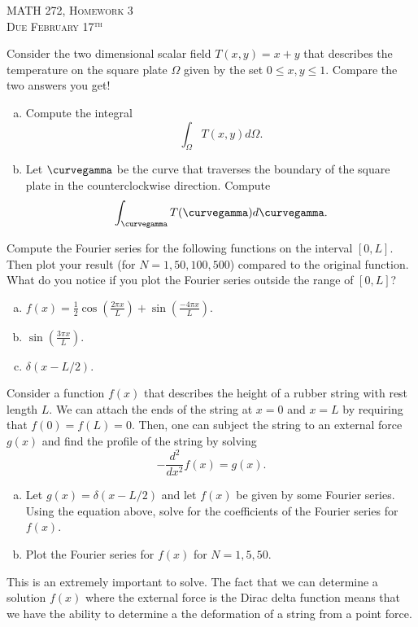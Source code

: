 \documentclass[12pt]{article} %
\begin{document}
\begin{center}
   \textsc{\large MATH 272, Homework 3}\\
   \textsc{Due February 17$^\textrm{th}$}
\end{center}
\vspace{.5cm}

%
%
\begin{problem}
Consider the two dimensional scalar field $T(x,y)=x+y$ that describes the temperature on the square plate $\Omega$ given by the set $0\leq x,y \leq 1$.  Compare the two answers you get!
\begin{enumerate}[(a)]
	\item Compute the integral
	\[
	\int_\Omega T(x,y)d\Omega.
	\]
	\item Let $\curvegamma$ be the curve that traverses the boundary of the square plate in the counterclockwise direction.  Compute
	\[
	\int_{\curvegamma} T(\curvegamma)d\curvegamma. 
	\]
\end{enumerate}
\end{problem}

\begin{problem}
Compute the Fourier series for the following functions on the interval $[0,L]$. Then plot your result (for $N=1,50,100,500$) compared to the original function. What do you notice if you plot the Fourier series outside the range of $[0,L]$?
\begin{enumerate}[(a)]
	\item $f(x)=\frac{1}{2}\cos\left(\frac{2\pi x}{L}\right)+\sin\left(\frac{-4\pi x}{L}\right)$.
	\item $\sin\left(\frac{3\pi x}{L}\right)$.
	\item $\delta(x-L/2)$.
\end{enumerate}
\end{problem}

\begin{problem}
Consider a function $f(x)$ that describes the height of a rubber string with rest length $L$. We can attach the ends of the string at $x=0$ and $x=L$ by requiring that $f(0)=f(L)=0$.  Then, one can subject the string to an external force $g(x)$ and find the profile of the string by solving
\[
-\frac{d^2}{dx^2} f(x) = g(x).
\]
\begin{enumerate}[(a)]
	\item Let $g(x)=\delta(x-L/2)$ and let $f(x)$ be given by some Fourier series.  Using the equation above, solve for the coefficients of the Fourier series for $f(x)$.
	\item Plot the Fourier series for $f(x)$ for $N=1,5,50$.
\end{enumerate}
This is an extremely important to solve. The fact that we can determine a solution $f(x)$ where the external force is the Dirac delta function means that we have the ability to determine a the deformation of a string from a point force.
\end{problem}
\end{document}
